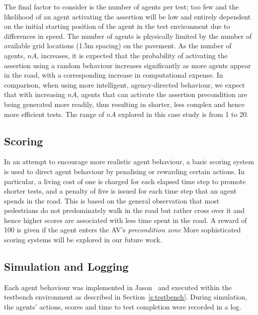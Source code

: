 \documentclass[letterpaper, 10 pt, journal, twoside]{IEEEtran}
\begin{document}
The final factor to consider is the number of agents per test; too few and the likelihood of an agent activating the assertion will be low and entirely dependent on the initial starting position of the agent in the test environment due to differences in speed. The number of agents is physically limited by the number of available grid locations (1.5m spacing) on the pavement. As the number of agents, $nA$, increases, it is expected that the probability of activating the assertion using a random behaviour increases significantly as more agents appear in the road, with a corresponding increase in computational expense. In comparison, when using more intelligent, agency-directed behaviour, we expect that with increasing $nA$, agents that can activate the assertion precondition are being generated more readily, thus resulting in shorter, less complex and hence more efficient tests. The range of $nA$ explored in this case study is from 1 to 20.

\subsection{Scoring}

In an attempt to encourage more realistic agent behaviour, a basic scoring system is used to direct agent behaviour by penalising or rewarding certain actions. In particular, a living cost of one is charged for each elapsed time step to promote shorter tests, and a penalty of five is issued for each time step that an agent spends in the road. This is based on the general observation that most pedestrians do not predominately walk in the road but rather cross over it and hence higher scores are associated with less time spent in the road. A reward of 100 is given if the agent enters the AV's \textit{precondition zone} More sophisticated scoring systems will be explored in our future work. 




\subsection{Simulation and Logging}

Each agent behaviour was implemented in Jason~\cite{bordini2005jason} and executed within the testbench environment as described in Section~\ref{s:testbench}. During simulation, the agents' actions, scores and time to test completion were recorded in a log.
\end{document}
